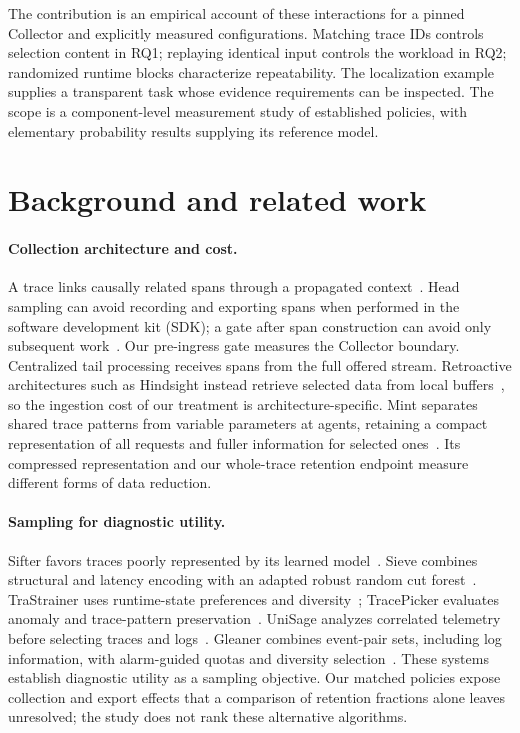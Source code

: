 The contribution is an empirical account of these interactions for a pinned Collector and explicitly measured configurations. Matching trace IDs controls selection content in RQ1; replaying identical input controls the workload in RQ2; randomized runtime blocks characterize repeatability. The localization example supplies a transparent task whose evidence requirements can be inspected. The scope is a component-level measurement study of established policies, with elementary probability results supplying its reference model.

\section{Background and related work}\label{sec:related}
\paragraph{Collection architecture and cost.}
A trace links causally related spans through a propagated context~\cite{W3CTraceContext}. Head sampling can avoid recording and exporting spans when performed in the software development kit (SDK); a gate after span construction can avoid only subsequent work~\cite{OTelSamplingSpec,otelSampling}. Our pre-ingress gate measures the Collector boundary. Centralized tail processing receives spans from the full offered stream. Retroactive architectures such as Hindsight instead retrieve selected data from local buffers~\cite{Hindsight2023}, so the ingestion cost of our treatment is architecture-specific. Mint separates shared trace patterns from variable parameters at agents, retaining a compact representation of all requests and fuller information for selected ones~\cite{huang2024mint}. Its compressed representation and our whole-trace retention endpoint measure different forms of data reduction.

\paragraph{Sampling for diagnostic utility.}
Sifter favors traces poorly represented by its learned model~\cite{lascasas2019sifter}. Sieve combines structural and latency encoding with an adapted robust random cut forest~\cite{huang2021sieve}. TraStrainer uses runtime-state preferences and diversity~\cite{huang2024trastrainer}; TracePicker evaluates anomaly and trace-pattern preservation~\cite{xie2025tracepicker}. UniSage analyzes correlated telemetry before selecting traces and logs~\cite{zhu2025unisage}. Gleaner combines event-pair sets, including log information, with alarm-guided quotas and diversity selection~\cite{yang2026gleaner}. These systems establish diagnostic utility as a sampling objective. Our matched policies expose collection and export effects that a comparison of retention fractions alone leaves unresolved; the study does not rank these alternative algorithms.

